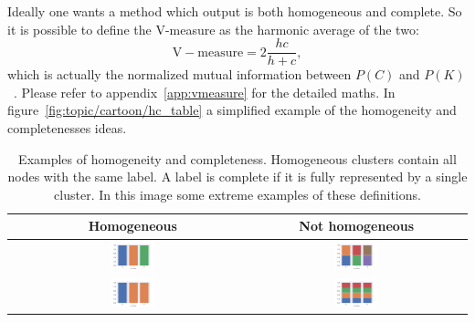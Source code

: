 Ideally one wants a method which output is both homogeneous and complete. So it is possible to define the V-measure as the harmonic average of the two:
\begin{equation}\label{eq:mutualinformation}
    \mathrm{V-measure}=2\frac{h c}{h + c},
\end{equation}
which is actually the normalized mutual information between $P(C)$ and $P(K)$~\cite{rosenberg2007v}. Please refer to appendix~\ref{app:vmeasure} for the detailed maths. In figure~\ref{fig:topic/cartoon/hc_table} a simplified example of the homogeneity and completenesses ideas.
\begin{table}[htb!]
	\centering
	\begin{tabular}{|c|c|c|}
		\hline
		&Homogeneous & Not homogeneous\\ \hline
		\rotatebox[origin=l]{90}{Complete}&    \includegraphics[width=0.2\textwidth]{pictures/topic/cartoon/cartoon_hc.pdf}&\includegraphics[width=0.2\textwidth]{pictures/topic/cartoon/cartoon_c.pdf}  \\ \hline
		\rotatebox{90}{Not complete}&   \includegraphics[width=0.2\textwidth]{pictures/topic/cartoon/cartoon_h.pdf}&\includegraphics[width=0.2\textwidth]{pictures/topic/cartoon/cartoon.pdf} \\ \hline
	\end{tabular}
	\caption{Examples of homogeneity and completeness. Homogeneous clusters contain all nodes with the same label. A label is complete if it is fully represented by a single cluster. In this image some extreme examples of these definitions.}
	\label{tab:topic/cartoon/hc_table}
\end{table}
			

